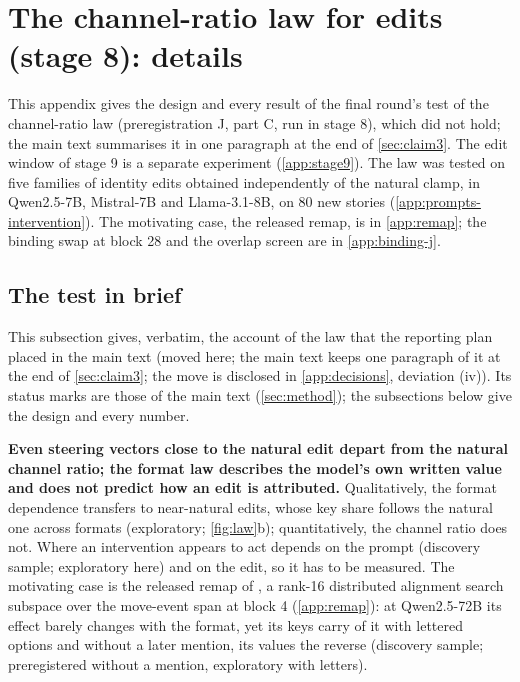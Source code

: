 \section{The channel-ratio law for edits (stage 8): details}\label{app:claim3}

This appendix gives the design and every result of the final round's test of the channel-ratio law (preregistration J, part C, run in stage 8), which did not hold; the main text summarises it in one paragraph at the end of \cref{sec:claim3}. The edit window of stage 9 is a separate experiment (\cref{app:stage9}). The law was tested on five families of identity edits obtained independently of the natural clamp, in Qwen2.5-7B, Mistral-7B and Llama-3.1-8B, on 80 new stories (\cref{app:prompts-intervention}). The motivating case, the released remap, is in \cref{app:remap}; the binding swap at block 28 and the overlap screen are in \cref{app:binding-j}. %

\subsection{The test in brief}\label{app:law-brief}

This subsection gives, verbatim, the account of the law that the reporting plan placed in the main text (moved here; the main text keeps one paragraph of it at the end of \cref{sec:claim3}; the move is disclosed in \cref{app:decisions}, deviation (iv)). Its status marks are those of the main text (\cref{sec:method}); the subsections below give the design and every number.

\textbf{Even steering vectors close to the natural edit depart from the natural channel ratio; the format law describes the model's own written value and does not predict how an edit is attributed.} %
Qualitatively, the format dependence transfers to near-natural edits, whose key share follows the natural one across formats (exploratory; \cref{fig:law}b); quantitatively, the channel ratio does not. Where an intervention appears to act depends on the prompt (discovery sample; exploratory here) and on the edit, so it has to be measured.
The motivating case is the released remap of \citet{anonymous2026fitted}, a rank-16 distributed alignment search subspace \citep{geiger2024finding} over the move-event span at block 4 (\cref{app:remap}): at Qwen2.5-72B its effect barely changes with the format, yet its keys carry \psiLetterQwen{} of it with lettered options and \psiNoneQwen{} without a later mention, its values the reverse (discovery sample; preregistered without a mention, exploratory with letters).

